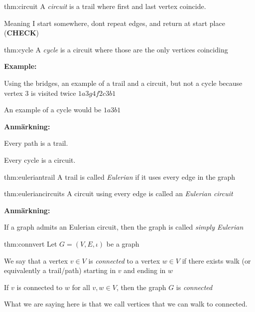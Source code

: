 \par\bigskip
\begin{theo}[Circuit]{thm:circuit}
  A \textit{circuit} is a trail where first and last vertex coincide.\par
  \noindent Meaning I start somewhere, dont repeat edges, and return at start place (\textbf{CHECK}) 
\end{theo}
\par\bigskip
\begin{theo}[Cycle]{thm:cycle}
  A \textit{cycle} is a circuit where those are the only vertices coinciding
\end{theo}
\par\bigskip
\noindent\textbf{Example:}\par
\noindent Using the bridges, an example of a trail and a circuit, but not a cycle because vertex 3 is visited twice $1a3g4f2c3b1$\par
\noindent An example of a cycle would be $1a3b1$
\par\bigskip
\noindent\textbf{Anmärkning:}\par
\noindent Every path is a trail.\par
\noindent Every cycle is a circuit.
\newpage
\begin{theo}{thm:euleriantrail}
  A trail is called \textit{Eulerian} if it uses every edge in the graph
\end{theo}
\par\bigskip
\begin{theo}{thm:euleriancircuits}
  A circuit using every edge is called an \textit{Eulerian circuit}
\end{theo}
\par\bigskip
\noindent\textbf{Anmärkning:}\par
\noindent If a graph admits an Eulerian circuit, then the graph is called \textit{simply Eulerian} 
\par\bigskip
\begin{theo}{thm:connvert}
  Let $G = (V,E, \iota)$ be a graph\par
  \noindent We say that a vertex $v\in V$ is \textit{connected} to a vertex $w\in V$ if there exists walk (or equivalently a trail/path) starting in $v$ and ending in $w$
  \par\bigskip
  \noindent If $v$ is connected to $w$ for all $v,w\in V$, then the graph $G$ is \textit{connected}
\end{theo}
\par\bigskip
\noindent What we are saying here is that we call vertices that we can walk to connected.
